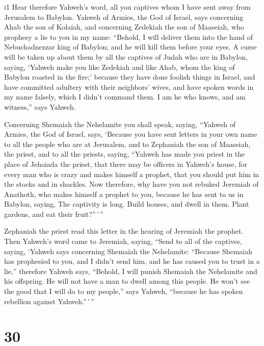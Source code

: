 i1 Hear therefore Yahweh's word, all you captives whom I
have sent away from Jerusalem to Babylon.  Yahweh of
Armies, the God of Israel, says concerning Ahab the son of Kolaiah, and
concerning Zedekiah the son of Maaseiah, who prophesy a lie to you in my
name: ``Behold, I will deliver them into the hand of Nebuchadnezzar king
of Babylon; and he will kill them before your eyes.  A
curse will be taken up about them by all the captives of Judah who are
in Babylon, saying, `Yahweh make you like Zedekiah and like Ahab, whom
the king of Babylon roasted in the fire;'  because they
have done foolish things in Israel, and have committed adultery with
their neighbors' wives, and have spoken words in my name falsely, which
I didn't command them. I am he who knows, and am witness,'' says Yahweh.

 Concerning Shemaiah the Nehelamite you shall speak,
saying,  ``Yahweh of Armies, the God of Israel, says,
`Because you have sent letters in your own name to all the people who
are at Jerusalem, and to Zephaniah the son of Maaseiah, the priest, and
to all the priests, saying,  ``Yahweh has made you priest
in the place of Jehoiada the priest, that there may be officers in
Yahweh's house, for every man who is crazy and makes himself a prophet,
that you should put him in the stocks and in shackles.  Now
therefore, why have you not rebuked Jeremiah of Anathoth, who makes
himself a prophet to you,  because he has sent to us in
Babylon, saying, The captivity is long. Build houses, and dwell in them.
Plant gardens, and eat their fruit?''\,'\,''

 Zephaniah the priest read this letter in the hearing of
Jeremiah the prophet.  Then Yahweh's word came to Jeremiah,
saying,  ``Send to all of the captives, saying, `Yahweh
says concerning Shemaiah the Nehelamite: ``Because Shemaiah has
prophesied to you, and I didn't send him, and he has caused you to trust
in a lie,''  therefore Yahweh says, ``Behold, I will punish
Shemaiah the Nehelamite and his offspring. He will not have a man to
dwell among this people. He won't see the good that I will do to my
people,'' says Yahweh, ``because he has spoken rebellion against
Yahweh.''\,'\,''

\hypertarget{section-29}{%
\section{30}\label{section-29}}

